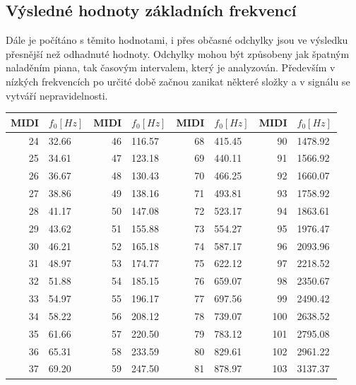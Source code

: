 \documentclass[a4paper, 12pt]{article}
\begin{document}
	\subsection{Výsledné hodnoty základních frekvencí}
	Dále je počítáno s těmito hodnotami, i přes občasné odchylky jsou ve výsledku přesnější než odhadnuté hodnoty. Odchylky mohou být způsobeny jak špatným naladěním piana, tak časovým intervalem, který je analyzován. Především v nízkých frekvencích po určité době začnou zanikat některé složky a v signálu se vytváří nepravidelnosti.
	
	\begin{table}[H]
		\begin{tabularx}{\textwidth}{r|Xr|Xr|Xr|X}
			MIDI & $f_0 [Hz]$ &        MIDI & $f_0 [Hz]$  &        MIDI & $f_0 [Hz]$ & MIDI & $f_0 [Hz]$ \\ \hline
			24 & 32.66     &       46 & 116.57     &       68 & 415.45     &       90 & 1478.92 \\
			25 & 34.61     &       47 & 123.18     &       69 & 440.11     &       91 & 1566.92 \\
			26 & 36.67     &       48 & 130.43     &       70 & 466.25     &       92 & 1660.07 \\
			27 & 38.86     &       49 & 138.16     &       71 & 493.81     &       93 & 1758.92 \\
			28 & 41.17     &       50 & 147.08     &       72 & 523.17     &       94 & 1863.61 \\
			29 & 43.62     &       51 & 155.88     &       73 & 554.27     &       95 & 1976.47 \\
			30 & 46.21     &       52 & 165.18     &       74 & 587.17     &       96 & 2093.96 \\
			31 & 48.97     &       53 & 174.77     &       75 & 622.12     &       97 & 2218.52 \\
			32 & 51.88     &       54 & 185.15     &       76 & 659.07     &       98 & 2350.67 \\
			33 & 54.97     &       55 & 196.17     &       77 & 697.56     &       99 & 2490.42 \\
			34 & 58.22     &       56 & 208.12     &       78 & 739.07     &       100 & 2638.52 \\
			35 & 61.66     &       57 & 220.50     &       79 & 783.12     &       101 & 2795.08 \\
			36 & 65.31     &       58 & 233.59     &       80 & 829.61     &       102 & 2961.22 \\
			37 & 69.20     &       59 & 247.50     &       81 & 878.97     &       103 & 3137.37 \\

\end{tabularx}
\end{table}
\end{document}
